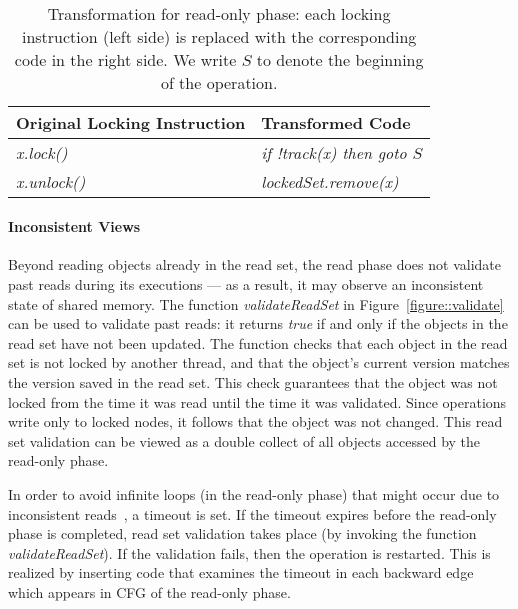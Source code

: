 \begin{table}
\scriptsize
\ttfamily
{\tt
\begin{center}
\begin{tabular}{|l|l|}
\hline
\textbf{Original Locking Instruction} & \textbf{Transformed Code}\\
\hline
\textit{x.lock()}&
\textit{if !track(x) then goto $S$}
\\
\hline
\textit{x.unlock()}&
\textit{lockedSet.remove(x)}
\\
\hline
\end{tabular}
\end{center}
}
\caption{Transformation for read-only phase:
each locking instruction (left side) is replaced with the corresponding code in the right side.
We write $S$ to denote the beginning of the operation.
}
\label{Ta:readOnlyTransformation}
\end{table}

\paragraph{Inconsistent Views}
Beyond reading objects already in the read set, the read phase does not validate past reads during its executions ---
as a result, it may observe an inconsistent state of shared memory.
%
The function \emph{validateReadSet} in Figure~\ref{figure::validate} can be used to validate past reads: it returns \emph{true} if and only if the objects in the read set have not been updated.
%
The function checks that each object in the read set is not locked by another thread,
and that the object's current version matches the version saved in the
read set.
This check guarantees that the object was not locked from the time it was read until
the time it was validated.
Since operations write only to
locked nodes, it follows that the object was not changed.
This read set validation can be viewed as a double collect
of all objects accessed by the read-only phase.

In order to avoid infinite loops (in the read-only phase) that might occur due to inconsistent reads~\cite{xxx}, a timeout is set.
If the timeout expires before the read-only phase is completed, read set
validation takes place (by invoking the function \emph{validateReadSet}). If the validation fails, then the operation is restarted.
This is realized by inserting code that examines the timeout in each backward edge which appears in CFG of the read-only phase.



